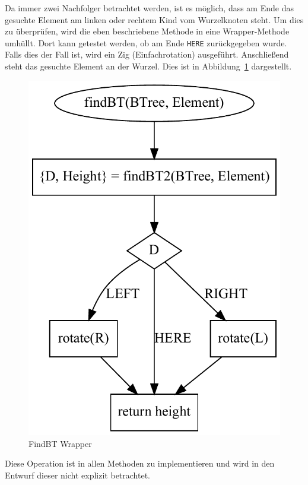 Da immer zwei Nachfolger betrachtet werden, ist es möglich, dass am Ende das gesuchte Element
am linken oder rechtem Kind vom Wurzelknoten steht.
Um dies zu überprüfen, wird die eben beschriebene Methode in eine Wrapper-Methode umhüllt.
Dort kann getestet werden, ob am Ende \verb|HERE| zurückgegeben wurde.
Falls dies der Fall ist, wird ein Zig (Einfachrotation) ausgeführt.
Anschließend steht das gesuchte Element an der Wurzel.
Dies ist in Abbildung~\ref{fig:splayFind2} dargestellt.
\begin{figure}[hbt]
    \centering
    \includegraphics[scale = 0.35]{img/gv/splayFind}
    \caption{FindBT Wrapper}
    \label{fig:splayFind2}
\end{figure}
Diese Operation ist in allen Methoden zu implementieren und wird in den Entwurf dieser nicht
explizit betrachtet.


